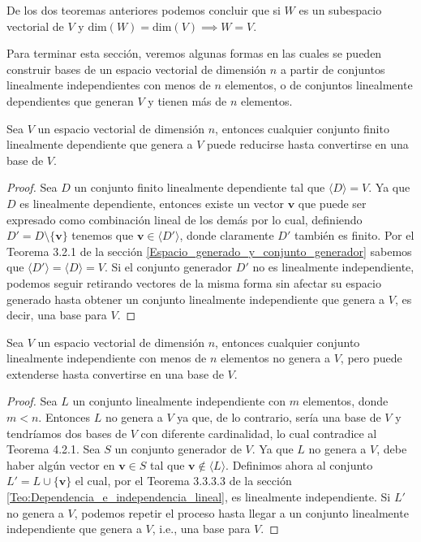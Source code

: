 \documentclass[12pt]{article}
\newenvironment{teorema}[2][Teorema]{\begin{trivlist}
\item[\hskip \labelsep {\bfseries #1}\hskip \labelsep {\bfseries #2.}]}{\end{trivlist}}
\newenvironment{corolario}[2][Corolario]{\begin{trivlist}
\item[\hskip \labelsep {\bfseries #1}]}{\end{trivlist}}
\begin{document}
\begin{corolario}{4.2}
    De los dos teoremas anteriores podemos concluir que si $W$ es un subespacio vectorial de $V$ y $\text{dim}(W)=\text{dim}(V)\implies W=V.$
\end{corolario}

Para terminar esta sección, veremos algunas formas en las cuales se pueden construir bases de un espacio vectorial de dimensión $n$ a partir de conjuntos linealmente independientes con menos de $n$ elementos, o de conjuntos linealmente dependientes que generan $V$ y tienen más de $n$ elementos.

\begin{teorema} {4.2.3.4}
    Sea $V$ un espacio vectorial de dimensión $n$, entonces cualquier conjunto finito linealmente dependiente que genera a $V$ puede reducirse hasta convertirse en una base de $V$.

\begin{proof}
    Sea $D$ un conjunto finito linealmente dependiente tal que $\langle D \rangle =V$. Ya que $D$ es linealmente dependiente, entonces existe un vector $\mathbf{v}$ que puede ser expresado como combinación lineal de los demás por lo cual, definiendo $D'=D\setminus\{\mathbf{v}\}$ tenemos que $\mathbf{v}\in\langle D' \rangle$, donde claramente $D'$ también es finito. Por el Teorema 3.2.1 de la sección \ref{Espacio_generado_y_conjunto_generador} sabemos que $\langle D' \rangle =\langle D \rangle =V$. Si el conjunto generador $D'$ no es linealmente independiente, podemos seguir retirando vectores de la misma forma sin afectar su espacio generado hasta obtener un conjunto linealmente independiente que genera a $V$, es decir, una base para $V$.
\end{proof}

\end{teorema}

\begin{teorema} {4.2.3.5}
Sea $V$ un espacio vectorial de dimensión $n$, entonces cualquier conjunto linealmente independiente con menos de $n$ elementos no genera a $V$, pero puede extenderse hasta convertirse en una base de $V$.

\begin{proof}
Sea $L$ un conjunto linealmente independiente con $m$ elementos, donde $m<n$. Entonces $L$ no genera a $V$ ya que, de lo contrario, sería una base de $V$ y tendríamos dos bases de $V$ con diferente cardinalidad, lo cual contradice al Teorema 4.2.1. Sea $S$ un conjunto generador de $V$. Ya que $L$ no genera a $V$, debe haber algún vector en $\mathbf{v}\in S$ tal que $\mathbf{v}\notin \langle L \rangle$. Definimos ahora al conjunto $L'=L\cup \{\mathbf{v}\}$ el cual, por el Teorema 3.3.3.3 de la sección \ref{Teo:Dependencia_e_independencia_lineal}, es linealmente independiente. Si $L'$ no genera a $V$, podemos repetir el proceso hasta llegar a un conjunto linealmente independiente que genera a $V$, i.e., una base para $V$.
\end{proof}

\end{teorema}
\end{document}
